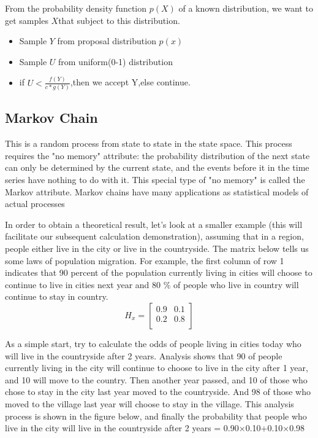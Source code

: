 From the probability density function $p(X)$ of a known distribution, we want to get  samples $X$that subject to this distribution.
\begin{itemize}
  \item Sample $Y$ from proposal distribution $p(x)$
  \item Sample $U$ from uniform(0-1) distribution
  \item if $U<\frac{f(Y)}{c*g(Y)}$,then we accept Y,else continue.
\end{itemize}


\subsection{Markov Chain}
This is a random process from state to state in the state space. This process requires the "no memory" attribute: the probability distribution of the next state can only be determined by the current state, and the events before it in the time series have nothing to do with it. This special type of "no memory" is called the Markov attribute. Markov chains have many applications as statistical models of actual processes


In order to obtain a theoretical result, let's look at a smaller example (this will facilitate our subsequent calculation demonstration), assuming that in a region, people either live in the city or live in the countryside. The matrix below tells us some laws  of population migration. For example, the first column of row 1 indicates that 90 percent of the population currently living in cities will choose to continue to live in cities next year and 80 \% of people who live in country will continue to stay in country.
$$
H_x={
\left[ \begin{array}{ccc}
0.9 & 0.1 \\
0.2 & 0.8\\
\end{array}
\right ]}
$$

As a simple start, try to calculate the odds of people living in cities today who will live in the countryside after 2 years. Analysis shows that 90 of people currently living in the city will continue to choose to live in the city after 1 year, and 10 will move to the country. Then another year passed, and 10 of those who chose to stay in the city last year moved to the countryside. And 98 of those who moved to the village last year will choose to stay in the village. This analysis process is shown in the figure below, and finally the probability that people who live in the city will live in the countryside after 2 years = 0.90×0.10+0.10×0.98


